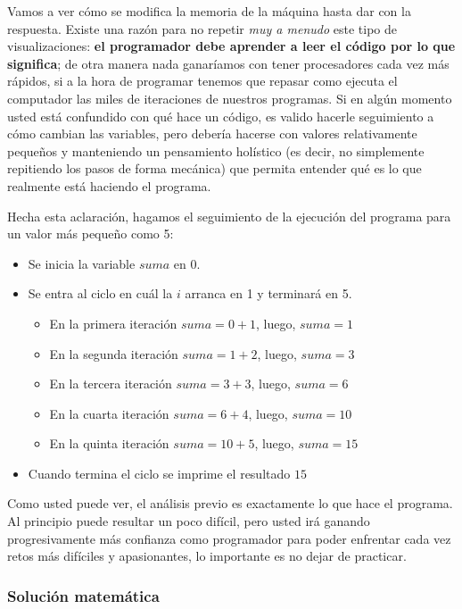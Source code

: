 Vamos a ver cómo se modifica la memoria de la máquina hasta dar con la respuesta. Existe una razón para no repetir \emph{muy a menudo} este tipo de visualizaciones: \textbf{el programador debe aprender a leer el código por lo que significa}; de otra manera nada ganaríamos con tener procesadores cada vez más rápidos, si a la hora de programar tenemos que repasar como ejecuta el computador las miles de iteraciones de nuestros programas. Si en algún momento usted está confundido con qué hace un código, es valido hacerle seguimiento a cómo cambian las variables, pero debería hacerse con valores relativamente pequeños y manteniendo un pensamiento holístico (es decir, no simplemente repitiendo los pasos de forma mecánica) que permita entender qué es lo que realmente está haciendo el programa.

Hecha esta aclaración, hagamos el seguimiento de la ejecución del programa para un valor más pequeño como 5:

\begin{itemize}
\item Se inicia la variable $suma$ en 0.
\item Se entra al ciclo en cuál la $i$ arranca en 1 y terminará en 5.
	\begin{itemize}
	\item En la primera iteración $suma=0+1$, luego, $suma = 1$
	\item En la segunda iteración $suma=1+2$, luego, $suma = 3$
	\item En la tercera iteración $suma=3+3$, luego, $suma = 6$
	\item En la cuarta iteración $suma=6+4$, luego, $suma = 10$
	\item En la quinta iteración $suma=10+5$, luego, $suma = 15$
	\end{itemize}
\item Cuando termina el ciclo se imprime el resultado $15$
\end{itemize}

Como usted puede ver, el análisis previo es exactamente lo que hace el programa. Al principio puede resultar un poco difícil, pero usted irá ganando progresivamente más confianza como programador para poder enfrentar cada vez retos más difíciles y apasionantes, lo importante es no dejar de practicar.

\subsubsection{Solución matemática}

